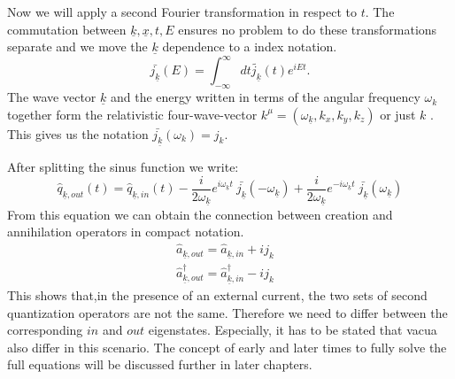 \documentclass[12pt, titlepage]{article}
\begin{document}
Now we will apply a second Fourier transformation in respect to $ t $. The commutation between $ \underline{k},\underline{x},t,E $ ensures no problem to do these transformations separate and we move the $ \underline{k} $ dependence to a index notation.
\begin{equation}
\bar{j_{\underline{k}}}(E)= \int^{\infty}_{-\infty}dt \tilde{j_{\underline{k}}}(t) e^{iEt}.
\end{equation}
The wave vector $ \underline{k} $ and the energy written in terms of the angular frequency $ \omega_{k} $ together form the relativistic  four-wave-vector $ k^{\mu}=(\omega_{\underline{k}},k_x,k_y,k_z) $ or just $ k $ . This gives us the notation $ \bar{j_{\underline{k}}}(\omega_k)=j_k $.

After splitting the sinus function we write:
\begin{equation}
\hat{q}_{\underline{k},out}(t) 
  =
  \hat{q}_{\underline{k},in}(t) 
  -
  	\dfrac{i}{2\omega_{\underline{k}}}e^{i\omega_{\underline{k}}t}\
  	\bar{j_{\underline{k}}}(-\omega_{\underline{k}})
  +
  	\dfrac{i}{2\omega_{\underline{k}}}e^{-i\omega_{\underline{k}}t}\
  	\bar{j_{\underline{k}}}(\omega_{\underline{k}})
\end{equation}
From this equation we can obtain the connection between creation and annihilation operators in compact notation.
\begin{subequations}
\begin{align}
\hat{a}_{\underline{k},out}=  \hat{a}_{\underline{k},in}+i
j_k
&\\
\hat{a}^{\dagger}_{\underline{k},out} = \hat{a}^{\dagger}_{\underline{k},in}
-i
j_k
\end{align}
\end{subequations}
This shows that,in the presence of an external current, the two sets of second quantization operators are not the same. Therefore we need to differ between the corresponding $ in $ and $ out $ eigenstates. Especially, it has to be stated that vacua also differ in this scenario. The concept of early and later times to fully solve the full equations will be discussed further in later chapters.
\end{document}
